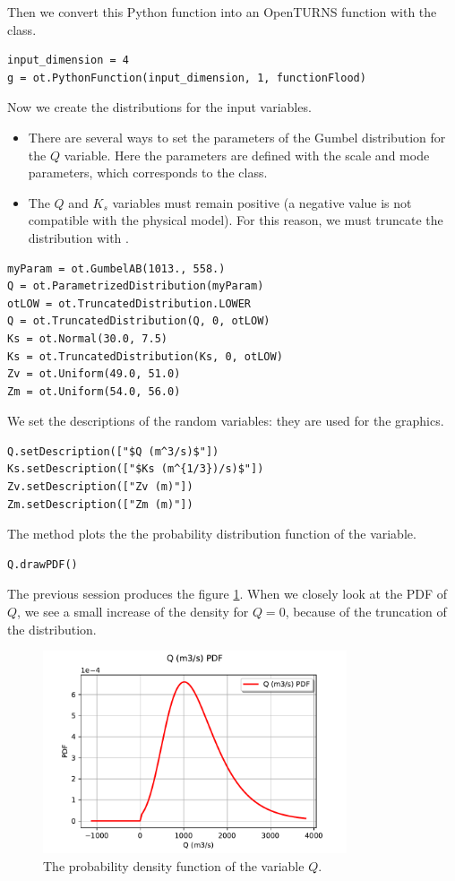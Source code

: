 \documentclass{article}
\begin{document}
Then we convert this Python function into an OpenTURNS function with the 
 class. 

\lstset{language=Python}
\begin{lstlisting}
input_dimension = 4
g = ot.PythonFunction(input_dimension, 1, functionFlood)
\end{lstlisting}

Now we create the distributions for the input variables.
\begin{itemize}
\item There are several ways to set the parameters of the Gumbel distribution for the $Q$ variable. 
Here the parameters are defined with the scale and mode parameters, which corresponds to the 
 class.
\item The $Q$ and $K_s$ variables must remain positive (a negative value is not compatible with the 
physical model). 
For this reason, we must truncate the distribution with 
.
\end{itemize}

\begin{lstlisting}
myParam = ot.GumbelAB(1013., 558.)
Q = ot.ParametrizedDistribution(myParam)
otLOW = ot.TruncatedDistribution.LOWER
Q = ot.TruncatedDistribution(Q, 0, otLOW)
Ks = ot.Normal(30.0, 7.5)
Ks = ot.TruncatedDistribution(Ks, 0, otLOW)
Zv = ot.Uniform(49.0, 51.0)
Zm = ot.Uniform(54.0, 56.0)
\end{lstlisting}

We set the descriptions of the random variables: they are used for the graphics.
\begin{lstlisting}
Q.setDescription(["$Q (m^3/s)$"])
Ks.setDescription(["$Ks (m^{1/3})/s)$"])
Zv.setDescription(["Zv (m)"])
Zm.setDescription(["Zm (m)"])
\end{lstlisting}

The  method plots the the probability distribution function of the variable. 
\begin{lstlisting}
Q.drawPDF()
\end{lstlisting}
The previous session produces the figure \ref{fig-variableQ}.
When we closely look at the PDF of $Q$, we see a small increase of the density for $Q=0$, because of the 
truncation of the distribution.


\begin{figure}
\centering
\includegraphics[width=0.8\textwidth]{figures/inputVariableQ.pdf}
\caption{The probability density function of the variable $Q$.}
\label{fig-variableQ}
\end{figure}
\end{document}
